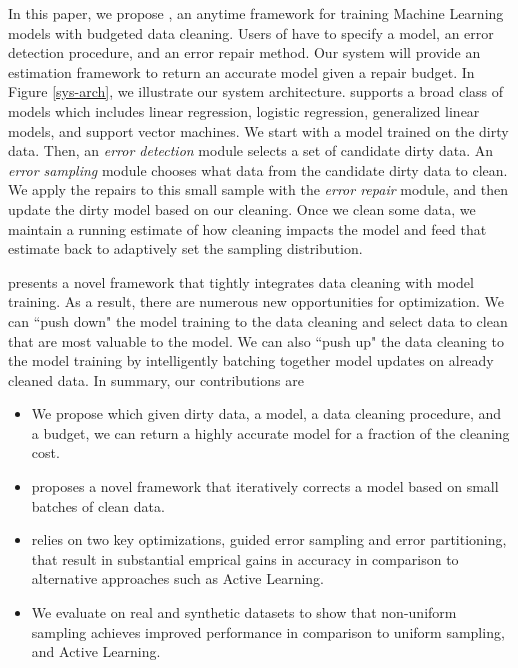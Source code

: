 In this paper, we propose \sys, an anytime framework for training Machine Learning models with budgeted data cleaning.
Users of \sys have to specify a model, an error detection procedure, and an error repair method.
Our system will provide an estimation framework to return an accurate model given a repair budget.
In Figure \ref{sys-arch}, we illustrate our system architecture.
\sys supports a broad class of models which includes linear regression, logistic regression, generalized linear models, and support vector machines.
We start with a model trained on the dirty data.
Then, an \emph{error detection} module selects a set of candidate dirty data.
An \emph{error sampling} module chooses what data from the candidate dirty data to clean.
We apply the repairs to this small sample with the \emph{error repair} module, and then update the dirty model based on our cleaning.
Once we clean some data, we maintain a running estimate of how cleaning impacts the model and feed that estimate back to adaptively set the sampling distribution.

\sys presents a novel framework that tightly integrates data cleaning with model training.
As a result, there are numerous new opportunities for optimization.
We can ``push down" the model training to the data cleaning and select data to clean that are most valuable to the model.
We can also ``push up" the data cleaning to the model training by intelligently batching together model updates on already cleaned data.
In summary, our contributions are
\begin{itemize}[noitemsep]
\item We propose \sysfull which given dirty data, a model, a data cleaning procedure, and a budget, we can return a highly accurate model for a fraction of the cleaning cost.
\item \sys proposes a novel framework that iteratively corrects a model based on small batches of clean data.
\item \sys relies on two key optimizations, guided error sampling and error partitioning, that result in substantial emprical gains in accuracy in comparison to alternative approaches such as Active Learning.
\item We evaluate \sysfull on real and synthetic datasets to show that non-uniform sampling achieves improved performance in comparison to uniform sampling, and Active Learning.
\end{itemize}








